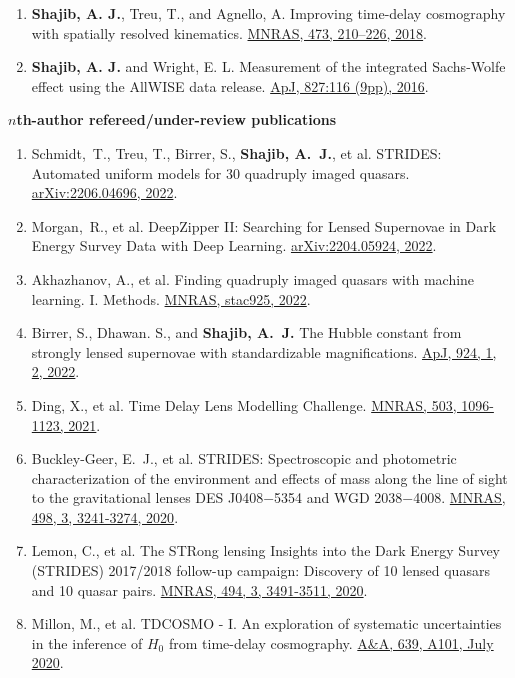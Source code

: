 \documentclass[margin, line]{res}
\begin{document}
\begin{resume}
\begin{enumerate}
	\item \textbf{Shajib, A. J.}, Treu, T., and Agnello, A. Improving time-delay cosmography with spatially resolved kinematics. \href{https://doi.org/10.1093/mnras/stx2302}{MNRAS, 473, 210--226, 2018}.
	\item \textbf{Shajib, A. J.} and Wright, E. L. Measurement of the integrated Sachs-Wolfe effect using the AllWISE data release. \href{http://dx.doi.org/10.3847/0004-637X/827/2/116}{ApJ, 827:116 (9pp), 2016}.
\end{enumerate}


\textbf{$n$th-author refereed/under-review publications}
\begin{enumerate}
	\item Schmidt,~T., Treu, T., Birrer, S., \textbf{Shajib, A.~J.}, et al. STRIDES: Automated uniform models for 30 quadruply imaged quasars. \href{https://arxiv.org/abs/2206.04696}{arXiv:2206.04696, 2022}.
	\item Morgan,~R., et al. DeepZipper II: Searching for Lensed Supernovae in Dark Energy Survey Data with Deep Learning. \href{https://arxiv.org/abs/2204.05924}{arXiv:2204.05924, 2022}.
	\item Akhazhanov, A., et al. Finding quadruply imaged quasars with machine learning. I. Methods. \href{https://ui.adsabs.harvard.edu/abs/2022MNRAS.tmp..904A/abstract}{MNRAS, stac925, 2022}.
	\item Birrer, S., Dhawan. S., and \textbf{Shajib, A.~J.} The Hubble constant from strongly lensed supernovae with standardizable magnifications. \href{https://iopscience.iop.org/article/10.3847/1538-4357/ac323a}{ApJ, 924, 1, 2, 2022}.
	\item Ding, X., et al. Time Delay Lens Modelling Challenge. \href{https://ui.adsabs.harvard.edu/abs/2021MNRAS.503.1096D/abstract}{MNRAS, 503, 1096-1123, 2021}.
	\item Buckley-Geer, E.~J., et al. STRIDES: Spectroscopic and photometric characterization of the environment and effects of mass along the line of sight to the gravitational lenses DES J0408$-$5354 and WGD 2038$-$4008. \href{https://ui.adsabs.harvard.edu/abs/2020MNRAS.498.3241B/abstract}{MNRAS, 498, 3, 3241-3274, 2020}.
	\item Lemon, C., et al. The STRong lensing Insights into the Dark Energy Survey (STRIDES) 2017/2018 follow-up campaign: Discovery of 10 lensed quasars and 10 quasar pairs. \href{https://doi.org/10.1093/mnras/staa652}{MNRAS, 494, 3, 3491-3511, 2020}.
	\item Millon, M., et al. TDCOSMO - I. An exploration of systematic uncertainties in the inference of $H_0$ from time-delay cosmography. \href{https://doi.org/10.1051/0004-6361/201937351}{A\&A, 639, A101, July 2020}.

\end{enumerate}
\end{resume}
\end{document}
